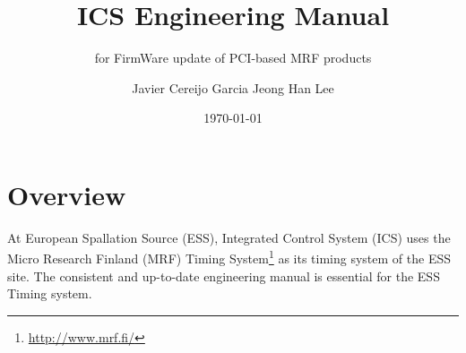 \documentclass[11pt
  , a4paper
  , article
  , oneside
  , showtrims
]{memoir}
\begin{document}


\date{\today}




\title{ICS Engineering Manual}
\subtitle{for FirmWare update of PCI-based MRF products}
\author{Javier Cereijo Garcia \newline Jeong Han Lee }



\showtrimson

\esstitle
\newpage
\tableofcontents
\newpage



\chapter{Overview}
At European Spallation Source (ESS), Integrated Control System (ICS) uses the Micro Research Finland (MRF) Timing System{\footnote{\url{http://www.mrf.fi/}}} as its timing system of the ESS site. The consistent and up-to-date engineering manual is essential for the ESS Timing system.
\end{document}
